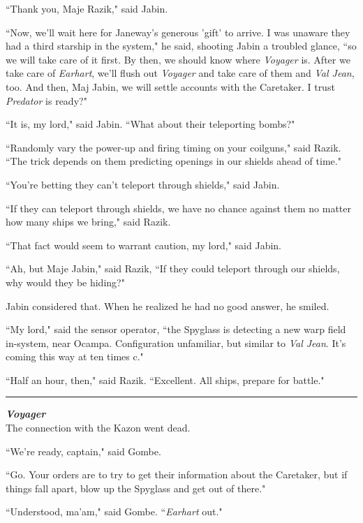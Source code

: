\documentclass[twoside,letterpaper,12pt]{memoir}
\begin{document}
``Thank you, Maje Razik," said Jabin.

``Now, we'll wait here for Janeway's generous 'gift' to arrive. I was unaware they had a third starship in the system," he said, shooting Jabin a troubled glance, ``so we will take care of it first. By then, we should know where \textit{Voyager} is. After we take care of \textit{Earhart}, we'll flush out \textit{Voyager} and take care of them and \textit{Val Jean}, too. And then, Maj Jabin, we will settle accounts with the Caretaker. I trust \textit{Predator} is ready?"

``It is, my lord," said Jabin. ``What about their teleporting bombs?"

``Randomly vary the power-up and firing timing on your coilguns," said Razik. ``The trick depends on them predicting openings in our shields ahead of time."

``You're betting they can't teleport through shields," said Jabin.

``If they can teleport through shields, we have no chance against them no matter how many ships we bring," said Razik.

``That fact would seem to warrant caution, my lord," said Jabin.

``Ah, but Maje Jabin," said Razik, ``If they could teleport through our shields, why would they be hiding?"

Jabin considered that. When he realized he had no good answer, he smiled.

``My lord," said the sensor operator, ``the Spyglass is detecting a new warp field in-system, near Ocampa. Configuration unfamiliar, but similar to \textit{Val Jean}. It's coming this way at ten times c."

``Half an hour, then," said Razik. ``Excellent. All ships, prepare for battle."

\begin{center}\rule{3cm}{0.4 pt}\end{center}

\noindent\textit{\textbf{Voyager}}\\

The connection with the Kazon went dead.

``We're ready, captain," said Gombe.

``Go. Your orders are to try to get their information about the Caretaker, but if things fall apart, blow up the Spyglass and get out of there."

``Understood, ma'am," said Gombe. ``\textit{Earhart} out."
\end{document}
